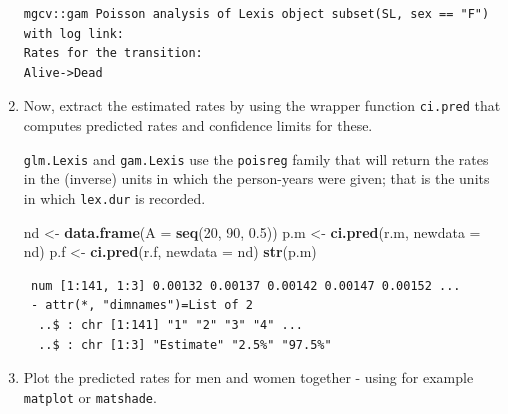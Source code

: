 \documentclass[
]{book}
\newenvironment{Shaded}{\begin{snugshade}}{\end{snugshade}}
\newcommand{\AttributeTok}[1]{\textcolor[rgb]{0.13,0.29,0.53}{#1}}
\newcommand{\DecValTok}[1]{\textcolor[rgb]{0.00,0.00,0.81}{#1}}
\newcommand{\FloatTok}[1]{\textcolor[rgb]{0.00,0.00,0.81}{#1}}
\newcommand{\FunctionTok}[1]{\textcolor[rgb]{0.13,0.29,0.53}{\textbf{#1}}}
\newcommand{\NormalTok}[1]{#1}
\newcommand{\OtherTok}[1]{\textcolor[rgb]{0.56,0.35,0.01}{#1}}
\begin{document}
\begin{enumerate}
\begin{verbatim}
mgcv::gam Poisson analysis of Lexis object subset(SL, sex == "F") with log link:
Rates for the transition:
Alive->Dead
\end{verbatim}
\item
  Now, extract the estimated rates by using the wrapper function
  \texttt{ci.pred} that computes predicted rates and confidence
  limits for these.

  \texttt{glm.Lexis} and \texttt{gam.Lexis} use the \texttt{poisreg} family that will return
  the rates in the (inverse) units in which the person-years were
  given; that is the units in which \texttt{lex.dur} is recorded.

\begin{Shaded}
\begin{Highlighting}[]
\NormalTok{nd }\OtherTok{\textless{}{-}} \FunctionTok{data.frame}\NormalTok{(}\AttributeTok{A =} \FunctionTok{seq}\NormalTok{(}\DecValTok{20}\NormalTok{, }\DecValTok{90}\NormalTok{, }\FloatTok{0.5}\NormalTok{))}
\NormalTok{p.m }\OtherTok{\textless{}{-}} \FunctionTok{ci.pred}\NormalTok{(r.m, }\AttributeTok{newdata =}\NormalTok{ nd)}
\NormalTok{p.f }\OtherTok{\textless{}{-}} \FunctionTok{ci.pred}\NormalTok{(r.f, }\AttributeTok{newdata =}\NormalTok{ nd)}
\FunctionTok{str}\NormalTok{(p.m)}
\end{Highlighting}
\end{Shaded}

\begin{verbatim}
 num [1:141, 1:3] 0.00132 0.00137 0.00142 0.00147 0.00152 ...
 - attr(*, "dimnames")=List of 2
  ..$ : chr [1:141] "1" "2" "3" "4" ...
  ..$ : chr [1:3] "Estimate" "2.5%" "97.5%"
\end{verbatim}
\item
  Plot the predicted rates for men and women together - using for
  example \texttt{matplot} or \texttt{matshade}.


\end{enumerate}
\end{document}
